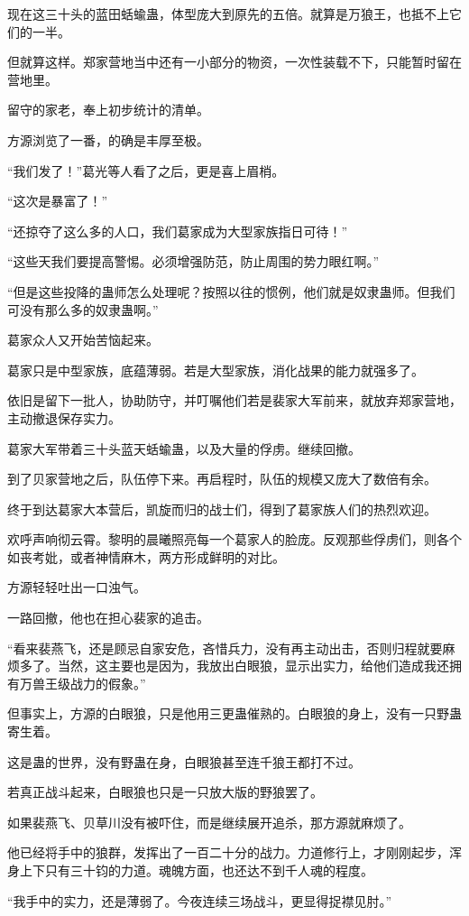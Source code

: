 \begin{this_body}
现在这三十头的蓝田蛞蝓蛊，体型庞大到原先的五倍。就算是万狼王，也抵不上它们的一半。

但就算这样。郑家营地当中还有一小部分的物资，一次性装载不下，只能暂时留在营地里。

留守的家老，奉上初步统计的清单。

方源浏览了一番，的确是丰厚至极。

“我们发了！”葛光等人看了之后，更是喜上眉梢。

“这次是暴富了！”

“还掠夺了这么多的人口，我们葛家成为大型家族指日可待！”

“这些天我们要提高警惕。必须增强防范，防止周围的势力眼红啊。”

“但是这些投降的蛊师怎么处理呢？按照以往的惯例，他们就是奴隶蛊师。但我们可没有那么多的奴隶蛊啊。”

葛家众人又开始苦恼起来。

葛家只是中型家族，底蕴薄弱。若是大型家族，消化战果的能力就强多了。

依旧是留下一批人，协助防守，并叮嘱他们若是裴家大军前来，就放弃郑家营地，主动撤退保存实力。

葛家大军带着三十头蓝天蛞蝓蛊，以及大量的俘虏。继续回撤。

到了贝家营地之后，队伍停下来。再启程时，队伍的规模又庞大了数倍有余。

终于到达葛家大本营后，凯旋而归的战士们，得到了葛家族人们的热烈欢迎。

欢呼声响彻云霄。黎明的晨曦照亮每一个葛家人的脸庞。反观那些俘虏们，则各个如丧考妣，或者神情麻木，两方形成鲜明的对比。

方源轻轻吐出一口浊气。

一路回撤，他也在担心裴家的追击。

“看来裴燕飞，还是顾忌自家安危，吝惜兵力，没有再主动出击，否则归程就要麻烦多了。当然，这主要也是因为，我放出白眼狼，显示出实力，给他们造成我还拥有万兽王级战力的假象。”

但事实上，方源的白眼狼，只是他用三更蛊催熟的。白眼狼的身上，没有一只野蛊寄生着。

这是蛊的世界，没有野蛊在身，白眼狼甚至连千狼王都打不过。

若真正战斗起来，白眼狼也只是一只放大版的野狼罢了。

如果裴燕飞、贝草川没有被吓住，而是继续展开追杀，那方源就麻烦了。

他已经将手中的狼群，发挥出了一百二十分的战力。力道修行上，才刚刚起步，浑身上下只有三十钧的力道。魂魄方面，也还达不到千人魂的程度。

“我手中的实力，还是薄弱了。今夜连续三场战斗，更显得捉襟见肘。”


\end{this_body}
